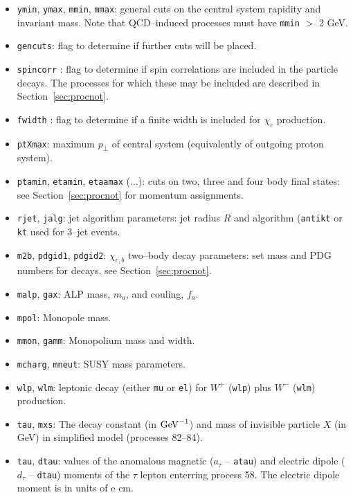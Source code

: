 \documentclass[12pt]{article}
\begin{document}
\begin{itemize}
with \texttt{genunw=.true.} (i.e. each with a different \texttt{iseed}, in order to produce multiple event records in parallel).
\item \texttt{ymin}, \texttt{ymax}, \texttt{mmin}, \texttt{mmax}: general cuts on the central system rapidity and invariant
 mass. Note that QCD--induced processes must have \texttt{mmin} $>$ 2 GeV.
\item \texttt{gencuts}: flag to determine if further cuts will be placed.
\item \texttt{spincorr} : flag to determine if spin correlations are included in the particle decays. The processes for 
which these may be included are described in Section~\ref{sec:procnot}.
\item \texttt{fwidth} : flag to determine if a finite width is included for $\chi_c$ production.
\item \texttt{ptXmax}: maximum $p_\perp$ of central system (equivalently of outgoing proton system).
\item \texttt{ptamin}, \texttt{etamin}, \texttt{etaamax} (...): cuts on two, three and four body final states: see 
Section~\ref{sec:procnot} for momentum assignments.
\item \texttt{rjet}, \texttt{jalg}: jet algorithm parameters: jet radius $R$ and algorithm (\texttt{antikt} or \texttt{kt}  
used for 3--jet events.
\item \texttt{m2b}, \texttt{pdgid1}, \texttt{pdgid2}: $\chi_{c,b}$ two--body decay parameters: set mass and PDG numbers for 
decays, see Section~\ref{sec:procnot}.
\item \texttt{malp}, \texttt{gax}: ALP mass, $m_a$, and couling, $f_a$.
\item \texttt{mpol}: Monopole mass.
\item \texttt{mmon}, \texttt{gamm}: Monopolium mass and width.
\item \texttt{mcharg}, \texttt{mneut}: SUSY mass parameters.
\item \texttt{wlp}, \texttt{wlm}: leptonic decay (either \texttt{mu} or \texttt{el}) for $W^+$ (\texttt{wlp}) plus 
$W^-$ (\texttt{wlm}) production.
\item \texttt{tau}, \texttt{mxs}: The decay constant (in ${\rm GeV}^{-1}$) and mass of invisible particle $X$ (in GeV) 
in simplified model (processes 82--84).
\item \texttt{tau}, \texttt{dtau}: values of the anomalous magnetic ($a_\tau$ -- \texttt{atau}) and electric dipole ($d_\tau$ -- \texttt{dtau}) moments of the $\tau$ lepton enterring process 58. The electric dipole moment is in units of e cm.

\end{itemize}
\end{document}
